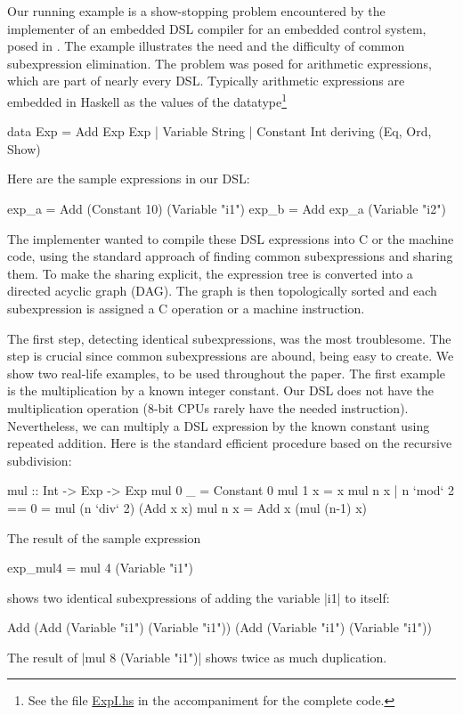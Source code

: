 \documentclass[submission,copyright,creativecommons]{eptcs}
\begin{document}
Our running example is a show-stopping problem encountered by the
implementer of an embedded DSL compiler for an embedded control
system, posed in \cite{Hawkins-CSE}.  The example illustrates the need
and the difficulty of common subexpression elimination. 
The problem was posed for arithmetic expressions, which are part of
nearly every DSL. Typically arithmetic expressions are embedded in
Haskell as the values of the datatype\footnote{See the file \url{ExpI.hs} in the accompaniment for the complete code.}
\begin{code}
data Exp
   = Add Exp Exp
   | Variable String
   | Constant Int
   deriving (Eq, Ord, Show)
\end{code}
Here are the sample expressions in our DSL:
\begin{code}
exp_a = Add (Constant 10) (Variable "i1")
exp_b = Add exp_a (Variable "i2")
\end{code}

The implementer wanted to compile these DSL expressions into C or
the machine code, using the standard approach of finding common
subexpressions and sharing them. To make the sharing explicit, the
expression tree is converted into a directed acyclic graph (DAG).  The
graph is then topologically sorted and each subexpression is assigned
a C operation or a machine instruction.

The first step, detecting identical subexpressions, was the most
troublesome. The step is crucial since common subexpressions are
abound, being easy to create. We show two real-life examples, to be used
throughout the paper. The first example is the multiplication by a
known integer constant. Our DSL does not have the multiplication
operation (8-bit CPUs rarely have the needed instruction).
Nevertheless, we can multiply a DSL expression by the known constant
using repeated addition. Here is the standard efficient procedure
based on the recursive subdivision:
\begin{code}
mul :: Int -> Exp -> Exp
mul 0 _ = Constant 0
mul 1 x = x
mul n x | n `mod` 2 == 0 = mul (n `div` 2) (Add x x)
mul n x = Add x (mul (n-1) x)
\end{code}
The result of the sample expression
\begin{code}
exp_mul4 = mul 4 (Variable "i1")
\end{code}
shows two identical subexpressions of adding the variable |i1| to itself:
\begin{code}
Add (Add (Variable "i1") (Variable "i1")) (Add (Variable "i1") (Variable "i1"))
\end{code}
The result of |mul 8 (Variable "i1")| shows twice as much duplication.
\end{document}
